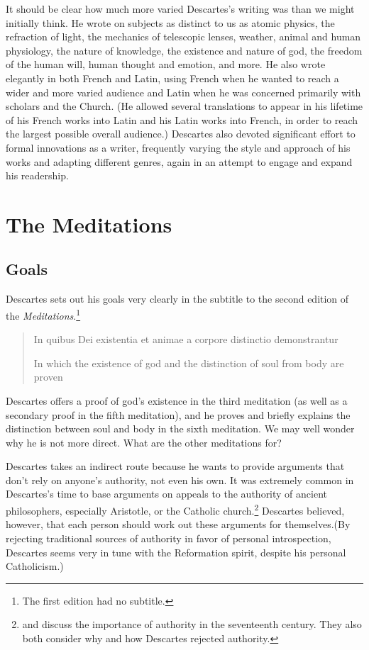 It should be clear how much more varied Descartes's writing was than we might initially think. He wrote on subjects as distinct to us as atomic physics, the refraction of light, the mechanics of telescopic lenses, weather, animal and human physiology, the nature of knowledge, the existence and nature of god, the freedom of the human will, human thought and emotion, and more. He also wrote elegantly in both French and Latin, using French when he wanted to reach a wider and more varied audience and Latin when he was concerned primarily with scholars and the Church. (He allowed several translations to appear in his lifetime of his French works into Latin and his Latin works into French, in order to reach the largest possible overall audience.) Descartes also devoted significant effort to formal innovations as a writer, frequently varying the style and approach of his works and adapting different genres, again in an attempt to engage and expand his readership.

\section*{The Meditations}

\subsection*{Goals}

Descartes sets out his goals very clearly in the subtitle to the second edition of the \textit{Meditations}.\footnote{The first edition had no subtitle.}

\begin{quote}
    In quibus Dei existentia et animae a corpore distinctio demonstrantur

    In which the existence of god and the distinction of soul from body are proven
\end{quote}

Descartes offers a proof of god's existence in the third meditation (as well as a secondary proof in the fifth meditation), and he proves and briefly explains the distinction between soul and body in the sixth meditation. We may well wonder why he is not more direct. What are the other meditations for?

Descartes takes an indirect route because he wants to provide arguments that don't rely on anyone's authority, not even his own. It was extremely common in Descartes's time to base arguments on appeals to the authority of ancient philosophers, especially Aristotle, or the Catholic church.\footnote{\citet[4--7]{cottingham1986} and \citet[4--5]{garber1998} discuss the importance of authority in the seventeenth century. They also both consider why and how Descartes rejected authority.} Descartes believed, however, that each person should work out these arguments for themselves.(By rejecting traditional sources of authority in favor of personal introspection, Descartes seems very in tune with the Reformation spirit, despite his personal Catholicism.)

